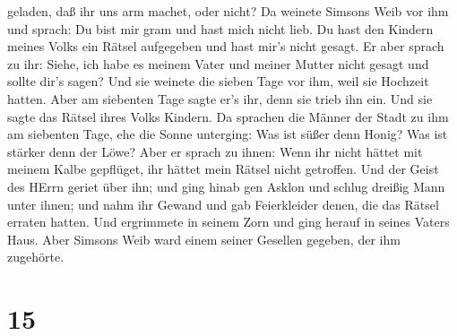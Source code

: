 geladen, daß ihr uns arm machet, oder nicht?  Da weinete
Simsons Weib vor ihm und sprach: Du bist mir gram und hast mich nicht
lieb. Du hast den Kindern meines Volks ein Rätsel aufgegeben und hast
mir's nicht gesagt. Er aber sprach zu ihr: Siehe, ich habe es meinem
Vater und meiner Mutter nicht gesagt und sollte dir's sagen?
 Und sie weinete die sieben Tage vor ihm, weil sie Hochzeit
hatten. Aber am siebenten Tage sagte er's ihr, denn sie trieb ihn ein.
Und sie sagte das Rätsel ihres Volks Kindern.  Da sprachen
die Männer der Stadt zu ihm am siebenten Tage, ehe die Sonne unterging:
Was ist süßer denn Honig? Was ist stärker denn der Löwe? Aber er sprach
zu ihnen: Wenn ihr nicht hättet mit meinem Kalbe gepflüget, ihr hättet
mein Rätsel nicht getroffen.  Und der Geist des HErrn
geriet über ihn; und ging hinab gen Asklon und schlug dreißig Mann unter
ihnen; und nahm ihr Gewand und gab Feierkleider denen, die das Rätsel
erraten hatten. Und ergrimmete in seinem Zorn und ging herauf in seines
Vaters Haus.  Aber Simsons Weib ward einem seiner Gesellen
gegeben, der ihm zugehörte.

\hypertarget{section-14}{%
\section{15}\label{section-14}}

